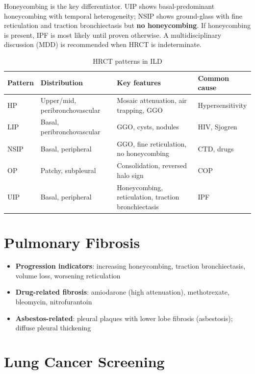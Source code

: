 \begin{pearlbox}
Honeycombing is the key differentiator. UIP shows basal-predominant honeycombing with temporal heterogeneity; NSIP shows ground-glass with fine reticulation and traction bronchiectasis but \textbf{no honeycombing}. If honeycombing is present, IPF is most likely until proven otherwise. A multidisciplinary discussion (MDD) is recommended when HRCT is indeterminate.
\end{pearlbox}

\begin{table}[h]
\centering
\caption{HRCT patterns in ILD}
\begin{tabular}{|p{}|p{}|p{}|p{}|}
\hline
\textbf{Pattern} & \textbf{Distribution} & \textbf{Key features} & \textbf{Common cause} \\
\hline
HP & Upper/mid, peribronchovascular & Mosaic attenuation, air trapping, GGO & Hypersensitivity \\
LIP & Basal, peribronchovascular & GGO, cysts, nodules & HIV, Sjogren \\
NSIP & Basal, peripheral & GGO, fine reticulation, no honeycombing & CTD, drugs \\
OP & Patchy, subpleural & Consolidation, reversed halo sign & COP \\
UIP & Basal, peripheral & Honeycombing, reticulation, traction bronchiectasis & IPF \\
\hline
\end{tabular}
\end{table}

\section{Pulmonary Fibrosis}
\begin{itemize}
  \item \textbf{Progression indicators}: increasing honeycombing, traction bronchiectasis, volume loss, worsening reticulation
  \item \textbf{Drug-related fibrosis}: amiodarone (high attenuation), methotrexate, bleomycin, nitrofurantoin
  \item \textbf{Asbestos-related}: pleural plaques with lower lobe fibrosis (asbestosis); diffuse pleural thickening
\end{itemize}

\section{Lung Cancer Screening}

